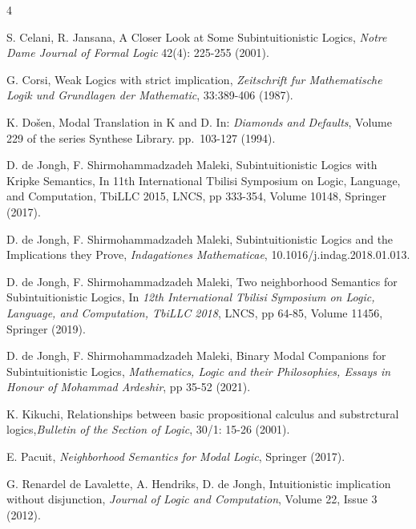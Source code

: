 \documentclass[12pt]{article}
\begin{document}
\begin{thebibliography}{4}


S. Celani, R. Jansana, A Closer Look at Some Subintuitionistic Logics, \textit{Notre Dame Journal of Formal Logic} 42(4): 225-255 (2001).
	

G. Corsi, Weak Logics with strict implication, \textit{Zeitschrift fur Mathematische Logik und Grundlagen der Mathematic}, 33:389-406 (1987).

K. Do\v{s}en, Modal Translation in {\sf K} and {\sf D}. In:  \textit{Diamonds and Defaults}, Volume 229 of the series Synthese Library. pp.\ 103-127 (1994).

D. de Jongh, F. Shirmohammadzadeh Maleki, Subintuitionistic Logics with Kripke Semantics, In 11th International Tbilisi Symposium on Logic, Language, and Computation, TbiLLC 2015, LNCS,  pp 333-354, Volume 10148, Springer (2017).

D. de Jongh, F. Shirmohammadzadeh Maleki, Subintuitionistic Logics and the
Implications they Prove, \textit{Indagationes Mathematicae}, 10.1016/j.indag.2018.01.013.

D. de Jongh, F. Shirmohammadzadeh Maleki, Two neighborhood Semantics for
Subintuitionistic Logics, In \textit{12th International Tbilisi Symposium on Logic, Language, and
Computation, TbiLLC 2018}, LNCS, pp 64-85, Volume 11456, Springer (2019).

D. de Jongh, F. Shirmohammadzadeh Maleki, Binary Modal Companions for Subintuitionistic Logics,  \textit{Mathematics, Logic and their Philosophies, Essays in Honour of Mohammad Ardeshir}, pp 35-52 (2021).

K. Kikuchi, Relationships between basic propositional calculus and substrctural logics,\textit{Bulletin of the Section of Logic}, 30/1: 15-26 (2001).

E. Pacuit, \textit{Neighborhood Semantics for Modal Logic}, Springer (2017).

G. Renardel de Lavalette, A. Hendriks, D. de Jongh, Intuitionistic implication without disjunction, \textit{Journal of Logic and Computation}, Volume 22, Issue 3 (2012).





\end{thebibliography}
\end{document}
